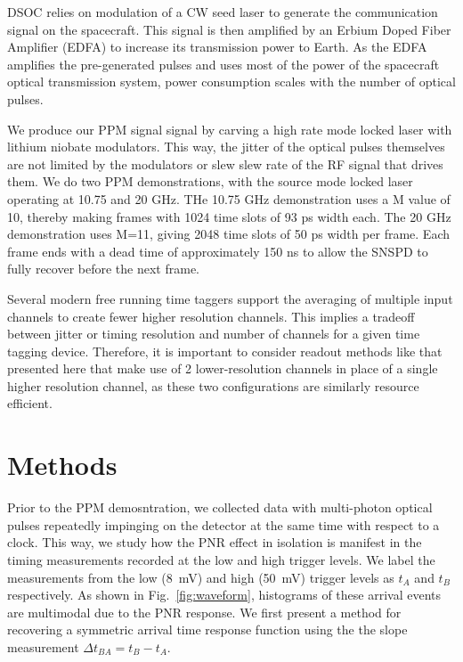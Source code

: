 \documentclass[11pt]{caltech_thesis} %
\begin{document}
DSOC relies on modulation of a CW seed laser to generate the communication signal on the spacecraft. This signal is then amplified by an Erbium Doped Fiber Amplifier (EDFA) to increase its transmission power to Earth. As the EDFA amplifies the pre-generated pulses and uses most of the power of the spacecraft optical transmission system, power consumption scales with the number of optical pulses.

We produce our PPM signal signal by carving a high rate mode locked laser with lithium niobate modulators. This way, the jitter of the optical pulses themselves are not limited by the modulators or slew slew rate of the RF signal that drives them. We do two PPM demonstrations, with the source mode locked laser operating at 10.75 and 20 GHz. THe 10.75 GHz demonstration uses a M value of 10, thereby making frames with 1024 time slots of 93 ps width each. The 20 GHz demonstration uses M=11, giving 2048 time slots of 50 ps width per frame. Each frame ends with a dead time of approximately 150 ns to allow the SNSPD to fully recover before the next frame.

Several modern free running time taggers support the averaging of multiple input channels to create fewer higher resolution channels. This implies a tradeoff between jitter or timing resolution and number of channels for a given time tagging device. Therefore, it is important to consider readout methods like that presented here that make use of 2 lower-resolution channels in place of a single higher resolution channel, as these two configurations are similarly resource efficient.

\hypertarget{methods}{%
\section{Methods}\label{methods}}

Prior to the PPM demosntration, we collected data with multi-photon optical pulses repeatedly impinging on the detector at the same time with respect to a clock. This way, we study how the PNR effect in isolation is manifest in the timing measurements recorded at the low and high trigger levels. We label the measurements from the low (8~mV) and high (50~mV) trigger levels as $t_A$ and $t_B$ respectively. As shown in Fig.~\ref{fig:waveform}, histograms of these arrival events are multimodal due to the PNR response. We first present a method for recovering a symmetric arrival time response function using the the slope measurement $\Delta t_{BA} = t_B - t_A$.
\end{document}
